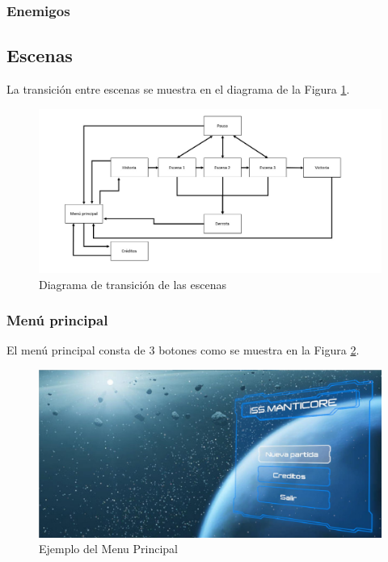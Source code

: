 \subsubsection{Enemigos}

\subsection{Escenas}

La transición entre escenas se muestra en el diagrama de la Figura \ref{fig:TrasicionEscenas3D}. 

\begin{figure}[H]
	\centering
	\includegraphics[scale=0.35]{imagenes/transicionEscenas.jpeg}
	\caption{\label{fig:TrasicionEscenas3D}Diagrama de transición de las escenas}
\end{figure}

\subsubsection{Menú principal}
El menú principal consta de 3 botones como se muestra en la Figura \ref{fig:MenuPrincipal3D1}.
\begin{figure}[H]
	\centering
	\includegraphics[scale=0.35]{imagenes/MenuPrincipal3D1.png}
	\caption{\label{fig:MenuPrincipal3D1}Ejemplo del Menu Principal}
\end{figure}

